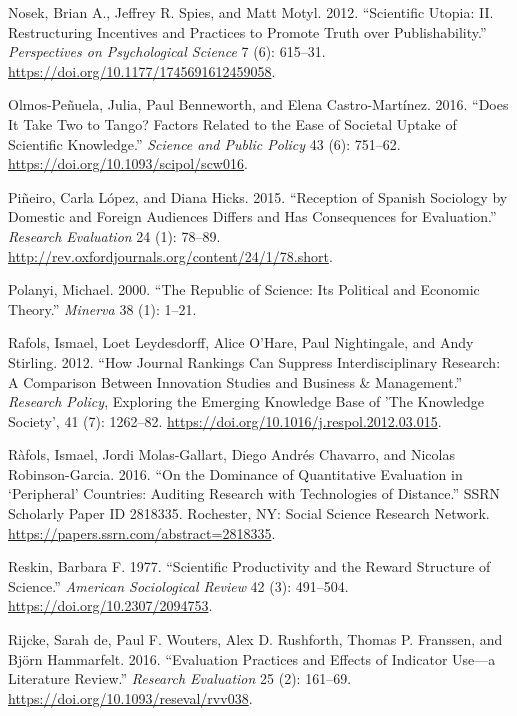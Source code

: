 \documentclass[]{elsarticle} %
\begin{document}
\leavevmode\hypertarget{ref-nosekScientificUtopiaII2012}{}%
Nosek, Brian A., Jeffrey R. Spies, and Matt Motyl. 2012. ``Scientific
Utopia: II. Restructuring Incentives and Practices to Promote Truth over
Publishability.'' \emph{Perspectives on Psychological Science} 7 (6):
615--31. \url{https://doi.org/10.1177/1745691612459058}.

\leavevmode\hypertarget{ref-olmos-penuelaDoesItTake2016}{}%
Olmos-Peñuela, Julia, Paul Benneworth, and Elena Castro-Martínez. 2016.
``Does It Take Two to Tango? Factors Related to the Ease of Societal
Uptake of Scientific Knowledge.'' \emph{Science and Public Policy} 43
(6): 751--62. \url{https://doi.org/10.1093/scipol/scw016}.

\leavevmode\hypertarget{ref-pineiroReceptionSpanishSociology2015}{}%
Piñeiro, Carla López, and Diana Hicks. 2015. ``Reception of Spanish
Sociology by Domestic and Foreign Audiences Differs and Has Consequences
for Evaluation.'' \emph{Research Evaluation} 24 (1): 78--89.
\url{http://rev.oxfordjournals.org/content/24/1/78.short}.

\leavevmode\hypertarget{ref-polanyiRepublicScienceIts2000}{}%
Polanyi, Michael. 2000. ``The Republic of Science: Its Political and
Economic Theory.'' \emph{Minerva} 38 (1): 1--21.

\leavevmode\hypertarget{ref-rafolsHowJournalRankings2012}{}%
Rafols, Ismael, Loet Leydesdorff, Alice O'Hare, Paul Nightingale, and
Andy Stirling. 2012. ``How Journal Rankings Can Suppress
Interdisciplinary Research: A Comparison Between Innovation Studies and
Business \& Management.'' \emph{Research Policy}, Exploring the Emerging
Knowledge Base of 'The Knowledge Society', 41 (7): 1262--82.
\url{https://doi.org/10.1016/j.respol.2012.03.015}.

\leavevmode\hypertarget{ref-rafolsDominanceQuantitativeEvaluation2016}{}%
Ràfols, Ismael, Jordi Molas-Gallart, Diego Andrés Chavarro, and Nicolas
Robinson-Garcia. 2016. ``On the Dominance of Quantitative Evaluation in
`Peripheral' Countries: Auditing Research with Technologies of
Distance.'' SSRN Scholarly Paper ID 2818335. Rochester, NY: Social
Science Research Network.
\url{https://papers.ssrn.com/abstract=2818335}.

\leavevmode\hypertarget{ref-reskinScientificProductivityReward1977}{}%
Reskin, Barbara F. 1977. ``Scientific Productivity and the Reward
Structure of Science.'' \emph{American Sociological Review} 42 (3):
491--504. \url{https://doi.org/10.2307/2094753}.

\leavevmode\hypertarget{ref-rijckeEvaluationPracticesEffects2016}{}%
Rijcke, Sarah de, Paul F. Wouters, Alex D. Rushforth, Thomas P.
Franssen, and Björn Hammarfelt. 2016. ``Evaluation Practices and Effects
of Indicator Use---a Literature Review.'' \emph{Research Evaluation} 25
(2): 161--69. \url{https://doi.org/10.1093/reseval/rvv038}.
\end{document}
